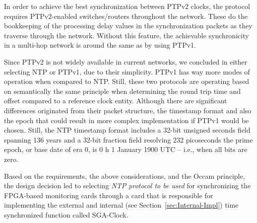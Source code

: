 \documentclass[journal]{IEEEtran}
\begin{document}
In order to achieve the best synchronization between PTPv2 clocks, the protocol requires PTPv2-enabled switches/routers throughout the network. These do the bookkeeping of the processing delay values in the synchronization packets as they traverse through the network. Without this feature, the achievable synchronicity in a multi-hop network is around the same as by using PTPv1.

Since PTPv2 is not widely available in current networks, we concluded in either selecting NTP or PTPv1, due to their simplicity. PTPv1 has way more modes of operation when compared to NTP. Still, these two protocols are operating based on semantically the same principle when determining the round
trip time and offset
compared to a reference clock entity. Although there are significant differences originated from their packet structure, the
timestamp format and also the epoch that could result in more complex implementation if PTPv1 would be chosen.
Still, the NTP timestamp format includes a 32-bit unsigned seconds field spanning 136 years and a 32-bit fraction field resolving 232
picoseconds the prime epoch, or base date of era 0, is 0 h 1 January 1900 UTC -- i.e., when all bits are zero.

Based on the requirements, the above considerations, and the Occam principle, the design decision led to selecting \emph{NTP protocol to be used} for synchronizing the
FPGA-based monitoring cards through a card that is responsible for implementing the external and internal (see
Section~\ref{sec:Internal-Impl}) time synchronized function called SGA-Clock.
\end{document}
